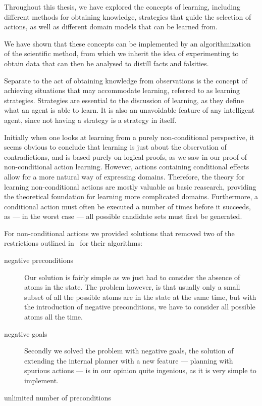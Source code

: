 \documentclass[Master.tex]{subfiles}
\begin{document}
Throughout this thesis, we have explored the concepts of learning, including different methods for obtaining knowledge, strategies that guide the selection of actions, as well as different domain models that can be learned from.

We have shown that these concepts can be implemented by an algorithmization of the scientific method, from which we inherit the idea of experimenting to obtain data that can then be analysed to distill facts and falsities.

	Separate to the act of obtaining knowledge from observations is the concept of achieving situations that may accommodate learning, referred to as learning strategies.
	Strategies are essential to the discussion of learning, as they define what an agent is able to learn.
	It is also an unavoidable feature of any intelligent agent, since not having a strategy is a strategy in itself. 


	Initially when one looks at learning from a purely non-conditional perspective, 
	it seems obvious to conclude that learning is just about the observation of contradictions,
	and is based purely on logical proofs, as we saw in our proof of non-conditional action learning.
    However, actions containing conditional effects allow for a more natural way of expressing domains. Therefore, the theory for learning non-conditional actions are mostly valuable as basic reasearch, providing the theoretical foundation for learning more complicated domains.
	Furthermore, a conditional action must often be executed a number of times before it succeeds, as --- in the worst case --- all possible candidate sets must first be generated.
	
	For non-conditional actions we provided solutions that removed two of the restrictions outlined in~\cite{Walsh2008} for their algorithms:
\begin{description}
    \item[negative preconditions] Our solution is fairly simple as we just had to consider the absence of atoms in the state. The problem however, is that usually only a small subset of all the possible atoms are in the state at the same time, but with the introduction of negative preconditions, we have to consider all possible atoms all the time.
    \item[negative goals] Secondly we solved the problem with negative goals, the solution of extending the internal planner with a new feature --- planning with spurious actions --- is in our opinion quite ingenious, as it is very simple to implement. 
    \item[unlimited number of preconditions]
\end{description}
	
\end{document}
